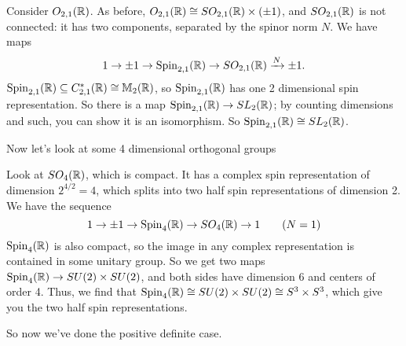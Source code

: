  \begin{example}
   Consider $O_{2,1}(\mathbb{R})$. As before, $O_{2,1}(\mathbb{R})\cong SO_{2,1}(\mathbb{R})\times (\pm
   1)$, and $SO_{2,1}(\mathbb{R})$ is not connected: it has two components, separated by the
   spinor norm $N$. We have maps
   \[
    1\to \pm 1 \to \operatorname{Spin}_{2,1}(\mathbb{R})\to SO_{2,1}(\mathbb{R}) \xrightarrow{N} \pm 1.
    \]
    $\operatorname{Spin}_{2,1}(\mathbb{R})\subseteq C^*_{2,1}(\mathbb{R}) \cong \mathbb{M}_2(\mathbb{R})$, so $\operatorname{Spin}_{2,1}(\mathbb{R})$
   has one 2 dimensional spin representation. So there is a map $\operatorname{Spin}_{2,1}(\mathbb{R})\to
   SL_2(\mathbb{R})$; by counting dimensions and such, you can show it is an isomorphism. So
   $\operatorname{Spin}_{2,1}(\mathbb{R})\cong SL_2(\mathbb{R})$.
 \end{example}
 Now let's look at some 4 dimensional orthogonal groups
 \begin{example}
   Look at $SO_4(\mathbb{R})$, which is compact. It has a complex spin representation of
   dimension $2^{4/2}=4$, which splits into two half spin representations of dimension
   2. We have the sequence
   \[
    1\to \pm 1\to \operatorname{Spin}_4(\mathbb{R})\to SO_4(\mathbb{R})\to 1 \qquad (N=1)
   \]
   $\operatorname{Spin}_4(\mathbb{R})$ is also compact, so the image in any complex representation is
   contained in some unitary group. So we get two maps $\operatorname{Spin}_4(\mathbb{R})\to SU(2)\times
   SU(2)$, and both sides have dimension 6 and centers of order 4. Thus, we find that
   $\operatorname{Spin}_4(\mathbb{R})\cong SU(2)\times SU(2) \cong S^3\times S^3$, which give you the two
   half spin representations.
 \end{example}
 So now we've done the positive definite case.
